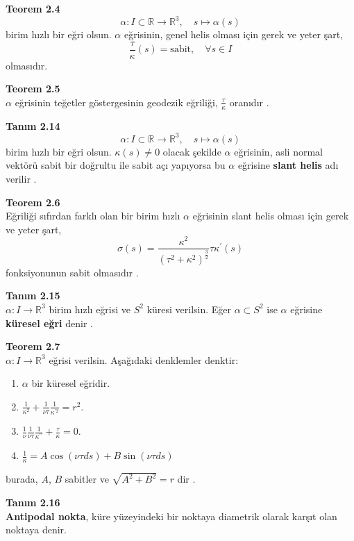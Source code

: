 \documentclass[a4paper,12pt]{article}
\begin{document}
\textbf{Teorem 2.4} \\ 
\[
\alpha: I \subset \mathbb{R} \to \mathbb{R}^3, \quad s \mapsto \alpha(s)
\]
birim hızlı bir eğri olsun. $\alpha$ eğrisinin, genel helis olması için gerek ve yeter şart,
\[
\frac{\tau}{\kappa}(s) = \text{sabit}, \quad \forall s \in I
\]
olmasıdır.

\textbf{Teorem 2.5} \\
$\alpha$ eğrisinin teğetler göstergesinin geodezik eğriliği, $\frac{\tau}{\kappa}$ oranıdır   .

\textbf{Tanım 2.14} \\
\[
\alpha: I \subset \mathbb{R} \to \mathbb{R}^3, \quad s \mapsto \alpha(s)
\]
birim hızlı bir eğri olsun. $\kappa(s) \neq 0$ olacak şekilde $\alpha$ eğrisinin, asli normal vektörü sabit bir doğrultu ile sabit açı yapıyorsa bu $\alpha$ eğrisine \textbf{slant helis} adı verilir   .

\textbf{Teorem 2.6} \\
Eğriliği sıfırdan farklı olan bir birim hızlı $\alpha$ eğrisinin slant helis olması için gerek ve yeter şart,
\[
\sigma(s) = \frac{\kappa^2}{(\tau^2 + \kappa^2)^{\frac{3}{2}}} \tau \kappa^\prime(s)
\]
fonksiyonunun sabit olmasıdır   .

\textbf{Tanım 2.15} \\
$\alpha: I \to \mathbb{R}^3$ birim hızlı eğrisi ve $S^2$ küresi verilsin. Eğer $\alpha \subset S^2$ ise $\alpha$ eğrisine \textbf{küresel eğri} denir   .

\textbf{Teorem 2.7} \\
$\alpha: I \to \mathbb{R}^3$ eğrisi verilsin. Aşağıdaki denklemler denktir:
\begin{enumerate}
    \item $\alpha$ bir küresel eğridir.
    \item $\frac{1}{\kappa^2} + \frac{1}{\nu \tau} \frac{1}{\kappa^{\prime 2}} = r^2$.
    \item $\frac{1}{\nu} \frac{1}{\nu \tau} \frac{1}{\kappa^{\prime \prime}} + \frac{\tau}{\kappa} = 0$.
    \item $\frac{1}{\kappa} = A \cos (\nu \tau ds) + B \sin (\nu \tau ds)$
    \end{enumerate}
burada, $A$, $B$ sabitler ve $\sqrt{A^2 + B^2} = r$ dir   .

\textbf{Tanım 2.16} \\
\textbf{Antipodal nokta}, küre yüzeyindeki bir noktaya diametrik olarak karşıt olan noktaya denir.
\end{document}
